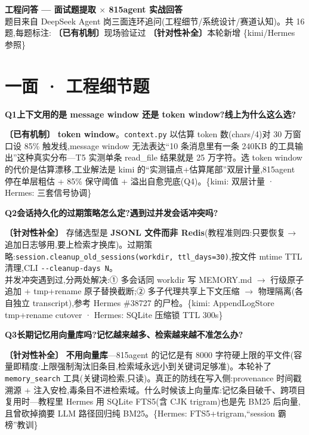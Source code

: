 \documentclass[10pt,a4paper]{article}
\renewcommand{\small}{\fontsize{8}{11.5}\selectfont}
\renewcommand{\footnotesize}{\fontsize{7.5}{10.5}\selectfont}
\renewcommand{\Large}{\fontsize{15}{20}\selectfont}
\newcommand{\taghave}{\textcolor{okc}{\textbf{〔已有机制〕}}}
\newcommand{\tagadded}{\textcolor{addc}{\textbf{〔针对性补全〕}}}
\newcommand{\tagref}[1]{\textcolor{dimc}{\footnotesize\{#1\}}}
\newcommand{\qhead}[2]{\par\vspace{7pt}\noindent
  \colorbox{acc}{\color{white}\bfseries\small #1}\hspace{4pt}\textbf{#2}\par\vspace{2pt}}
\newenvironment{qa}[2]{\qhead{#1}{#2}\small}{\par\vspace{2pt}}
\begin{document}
\begin{center}
  {\Large\bfseries\sffamily 工程问答 --- 面试题提取 $\times$ 815agent 实战回答}\\[4pt]
  {\small\color{dimc}题目来自 DeepSeek Agent 岗三面连环追问(工程细节/系统设计/赛道认知)。共 16 题,每题标注:
  \textcolor{okc}{\textbf{〔已有机制〕}}现场验证过 \quad
  \textcolor{addc}{\textbf{〔针对性补全〕}}本轮新增 \quad
  \textcolor{dimc}{\{kimi/Hermes 参照\}}}
\end{center}
\vspace{-4pt}

\section{一面 · 工程细节题}

\begin{qa}{Q1}{上下文用的是 message window 还是 token window?线上为什么这么选?}
\taghave{} \textbf{token window}。\texttt{context.py} 以估算 token 数(chars/4)对 30 万窗口设 85\% 触发线,message window 无法表达``10 条消息里有一条 240KB 的工具输出''这种真实分布---T5 实测单条 read\_file 结果就是 25 万字符。选 token window 的代价是估算漂移,工业解法是 kimi 的``实测锚点+估算尾部''双层计量,815agent 停在单层粗估 + 85\% 保守阈值 + 溢出自愈兜底(Q4)。\tagref{kimi: 双层计量 · Hermes: 三套信号协调}
\end{qa}

\begin{qa}{Q2}{会话持久化的过期策略怎么定?遇到过并发会话冲突吗?}
\tagadded{} 存储选型是 \textbf{JSONL 文件而非 Redis}(教程准则四:只要恢复$\to$追加日志够用,要上检索才换库)。过期策略:\texttt{session.cleanup\_old\_sessions(workdir, ttl\_days=30)},按文件 mtime TTL 清理,CLI \texttt{-{}-cleanup-days N}。\\
并发冲突遇到过,分两处解决:① 多会话同 workdir 写 MEMORY.md $\to$ 行级原子追加 + tmp+rename 原子替换截断;② 多子代理共享上下文压缩 $\to$ 物理隔离(各自独立 transcript),参考 Hermes \#38727 的尸检。\tagref{kimi: AppendLogStore tmp+rename cutover · Hermes: SQLite 压缩锁 TTL 300s}
\end{qa}

\begin{qa}{Q3}{长期记忆用向量库吗?记忆越来越多、检索越来越不准怎么办?}
\tagadded{} \textbf{不用向量库}---815agent 的记忆是有 8000 字符硬上限的平文件(容量即精度:上限强制淘汰旧条目,检索域永远小到关键词足够准)。本轮补了 \texttt{memory\_search} 工具(关键词检索,只读)。真正的防线在写入侧:provenance 时间戳溯源 + 注入安检,毒条目不进检索域。什么时候该上向量库:记忆条目破千、跨项目复用时---教程里 Hermes 用 SQLite FTS5(含 CJK trigram)也是先 BM25 后向量,且曾砍掉摘要 LLM 路径回归纯 BM25。\tagref{Hermes: FTS5+trigram,``session 霸榜''教训}
\end{qa}
\end{document}
